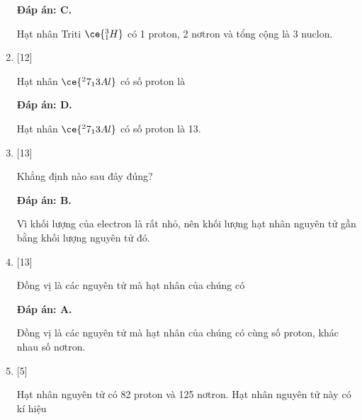 \begin{enumerate}[label=\bfseries Câu \arabic*:]
	\loigiai
	{		\textbf{Đáp án: C.}
		
		Hạt nhân Triti $\ce{^3_1 H}$ có 1 proton, 2 nơtron và tổng cộng là 3 nuclon.
		
	}
	\item {} [12]
	\cauhoi
	{Hạt nhân $\ce{^27_13 Al}$ có số proton là
	}
	
	\loigiai
	{		\textbf{Đáp án: D.}
		
		Hạt nhân $\ce{^27_13 Al}$ có số proton là 13.
		
	}
	\item {} [13]
	\cauhoi
	{Khẳng định nào sau đây đúng?
	}
	
	\loigiai
	{		\textbf{Đáp án: B.}
		
		Vì khối lượng của electron là rất nhỏ, nên khối lượng hạt nhân nguyên tử gần bằng khối lượng nguyên tử đó.
		
	}
	\item {} [13]
	\cauhoi
	{Đồng vị là các nguyên tử mà hạt nhân của chúng có
	}
	
	\loigiai
	{		\textbf{Đáp án: A.}
		
		Đồng vị là các nguyên tử mà hạt nhân của chúng có cùng số proton, khác nhau số nơtron.
		
	}
	\item {} [5]
	\cauhoi
	{Hạt nhân nguyên tử có 82 proton và 125 nơtron. Hạt nhân nguyên tử này có kí hiệu
	}
	

\end{enumerate}
